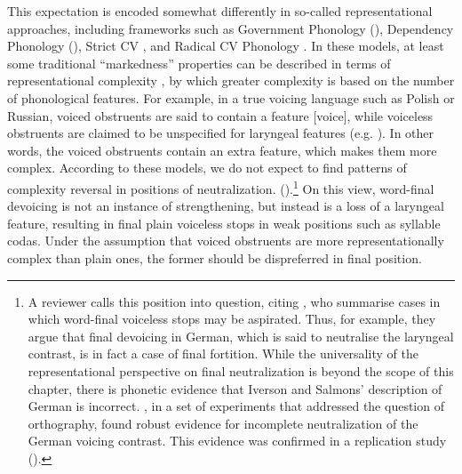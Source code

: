 \documentclass[output=paper]{langscibook}
\begin{document}
This expectation is encoded somewhat differently in so-called representational approaches, including frameworks such as Government Phonology (\citealt{KayeEtAl1990,Charette1991}), Dependency Phonology (\citealt{AndersonJones1974,AndersonEwen1987,Botma2004}), Strict CV \citep{Scheer2004}, and Radical CV Phonology \citep{Hulst2020}. In these models, at least some traditional “markedness” properties can be described in terms of representational complexity \citep{Ulfsbjorninn2017}, by which greater complexity is based on the number of phonological features. For example, in a true voicing language such as Polish or Russian, voiced obstruents are said to contain a feature [voice], while voiceless obstruents are claimed to be unspecified for laryngeal features (e.g. \citealt{BeckmanEtAl2013}). In other words, the voiced obstruents contain an extra feature, which makes them more complex.  According to these models, we do not expect to find patterns of complexity reversal in positions of neutralization. (\citealt{Harris1997,Harris2005,Cyran2010,SégéralScheer2001}).\footnote{A reviewer calls this position into question, citing \citet{IversonSalmons2011}, who summarise cases in which word-final voiceless stops may be aspirated. Thus, for example, they argue that final devoicing in German, which is said to neutralise the laryngeal contrast, is in fact a case of final fortition. While the universality of the representational perspective on final neutralization is beyond the scope of this chapter, there is phonetic evidence that Iverson and Salmons’ description of German is incorrect. \citet{RoettgerEtAl2014}, in a set of experiments that addressed the question of orthography, found robust evidence for incomplete neutralization of the German voicing contrast. This evidence was confirmed in a replication study (\citealt{RoettgerBaer-Henney2019}).} On this view, word-final devoicing is not an instance of strengthening, but instead is a loss of a laryngeal feature, resulting in final plain voiceless stops in weak positions such as syllable codas. Under the assumption that voiced obstruents are more representationally complex than plain ones, the former should be dispreferred in final position.
\end{document}
